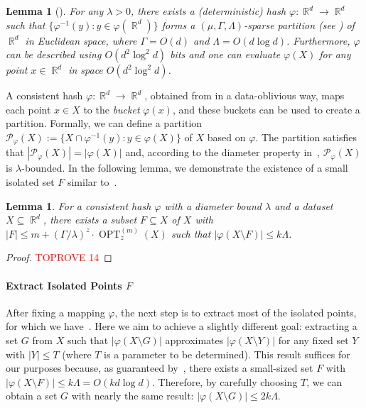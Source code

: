 \documentclass[letterpaper,11pt]{article}
\theoremstyle{plain}
\newtheorem{lemma}[theorem]{Lemma}
\theoremstyle{definition}
\theoremstyle{remark}
\DeclareMathOperator{\R}{\mathbb{R}}
\DeclareMathOperator{\OPT}{OPT}
\renewcommand{\phi}{\varphi}
\newcommand{\calP}{\mathcal{P}}
\begin{document}
\begin{lemma}[{\cite[Theorem 5.1]{arxiv.2204.02095}}]
    \label{lem:consistent hashing}
    For any $\lambda > 0$, there exists a (deterministic) hash $\phi :\R^d\to\R^d$ such that $\{\phi^{-1}(y):y\in \phi(\R^d)\}$ forms a $(\mu,\Gamma,\Lambda)$-sparse partition (see ) of $\R^d$ in Euclidean space, where $\Gamma= O(d)$ and $\Lambda = O(d\log d)$.
Furthermore, $\phi$ can be described using $O(d^2\log^2d)$ bits and one can evaluate $\phi(X)$ for any point $x\in\R^d$ in space $O(d^2\log^2d)$.
\end{lemma}
A consistent hash $\phi:\R^d\to\R^d$, obtained from  in a data-oblivious way, maps each point $x\in X$ to the \emph{bucket} $\phi(x)$, and these buckets can be used to create a partition. Formally, we can define a partition $\calP_{\phi}(X):=\{X\cap \phi^{-1}(y):y\in \phi(X) \}$ of $X$ based on $\phi$. The partition satisfies that $|\calP_{\phi}(X)|=|\phi(X) |$ and,
according to the diameter property in~, $\calP_{\phi}(X)$ is $\lambda$-bounded.
In the following lemma, we demonstrate the existence of a small isolated set $F$ similar to~.

\begin{lemma}
    \label{lem:bounded size}
    For a consistent hash $\phi$ with a diameter bound $\lambda$ and a dataset $X\subseteq \R^d$, there exists a subset $F\subseteq X$ of $X$ with $|F|\le m + (\Gamma/\lambda)^z\cdot\OPT_z^{(m)}(X)$ such that $|\phi(X\setminus F)|\le k\Lambda$.
\end{lemma}
\begin{proof}\textcolor{red}{TOPROVE 14}\end{proof}

\paragraph{Extract Isolated Points $F$} 
After fixing a mapping $\phi$, the next step is to extract most of the isolated points, for which we have~.
Here we aim to achieve a slightly different goal: extracting a set $G$ from $X$ such that $|\phi(X\setminus G)|$ approximates $|\phi(X\setminus Y)|$ for any fixed set $Y$ with $|Y| \le T$ (where $T$ is a parameter to be determined). This result suffices for our purposes because, as guaranteed by~, there exists a small-sized set $F$ with $|\phi(X\setminus F)| \le k\Lambda = O(kd\log d)$. Therefore, by carefully choosing $T$, we can obtain a set $G$ with nearly the same result: $|\phi(X\setminus G)| \le 2k\Lambda$.
\end{document}
